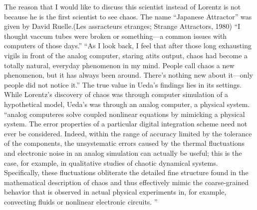 \documentclass[12pt,twoside]{book}
\begin{document}
The reason that I would like to discuss this scientist instead of Lorentz is not because he is the first scientist to see chaos.
The name ``Japanese Attractor'' was given by David Ruelle.(Les assracteurs etranges; Strange Attractors, 1980)
``I thought vaccum tubes were broken or something---a common issues with computers of those days.'' \citep{lorentzbook} %
``As I look back, I feel that after those long exhausting vigils in front of the analog computer, staring atits output, chaos had become a totally natural, everyday phenomenon in my mind.
People call chaos a new phenomenon, but it has always been around.
There's nothing new about it---only people did not notice it.''\cite[p.27]{ueda-abraham}
The true value in Ueda's findings lies in its settings.
While Lorentz's discovery of chaos was through computer simulation of a hypothetical model, Ueda's was through an analog computer, a physical system.
``analog computeres solve coupled nonlinear equations by mimicking a physical system.
The error properties of a particular digital integration scheme need not ever be considered.
Indeed, within the range of accuracy limited by the tolerance of the components, the unsystematic errors caused by the thermal fluctuations and electronic noise in an analog simulation can actually be useful; this is the case, for example, in qualitative studies of chaotic dynamical systems.
Specifically, these fluctuations obliterate the detailed fine structure found in the mathematical description of chaos and thus effectively mimic the coarse-grained behavior that is observed in actual physical experiments in, for example, convecting fluids or nonlinear electronic circuits.
''\cite[p.383]{campbell}
\end{document}

